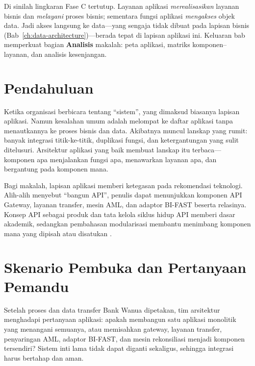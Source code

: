 Di sinilah lingkaran Fase C tertutup. Layanan aplikasi \emph{merealisasikan}
layanan bisnis dan \emph{melayani} proses bisnis; sementara fungsi aplikasi
\emph{mengakses} objek data. Jadi akses langsung ke data---yang sengaja tidak
dibuat pada lapisan bisnis (Bab~\ref{ch:data-architecture})---berada tepat di
lapisan aplikasi ini. Keluaran bab memperkuat bagian \textbf{Analisis} makalah:
peta aplikasi, matriks komponen--layanan, dan analisis kesenjangan.

\section{Pendahuluan}

Ketika organisasi berbicara tentang ``sistem'', yang dimaksud biasanya lapisan
aplikasi. Namun kesalahan umum adalah melompat ke daftar aplikasi tanpa
menautkannya ke proses bisnis dan data. Akibatnya muncul lanskap yang rumit:
banyak integrasi titik-ke-titik, duplikasi fungsi, dan ketergantungan yang sulit
ditelusuri. Arsitektur aplikasi yang baik membuat lanskap itu terbaca---komponen
apa menjalankan fungsi apa, menawarkan layanan apa, dan bergantung pada komponen
mana.

Bagi makalah, lapisan aplikasi memberi ketegasan pada rekomendasi teknologi.
Alih-alih menyebut ``bangun API'', penulis dapat menunjukkan komponen API
Gateway, layanan transfer, mesin AML, dan adaptor BI-FAST beserta relasinya.
Konsep API sebagai produk \cite{jacobson2011apis} dan tata kelola siklus hidup
API \cite{medjaoui2018continuous} memberi dasar akademik, sedangkan pembahasan
modularisasi membantu menimbang komponen mana yang dipisah atau disatukan
\cite{newman2021building}.

\section{Skenario Pembuka dan Pertanyaan Pemandu}

Setelah proses dan data transfer Bank Wanua dipetakan, tim arsitektur menghadapi
pertanyaan aplikasi: apakah membangun satu aplikasi monolitik yang menangani
semuanya, atau memisahkan gateway, layanan transfer, penyaringan AML, adaptor
BI-FAST, dan mesin rekonsiliasi menjadi komponen tersendiri? Sistem inti lama
tidak dapat diganti sekaligus, sehingga integrasi harus bertahap dan aman.

